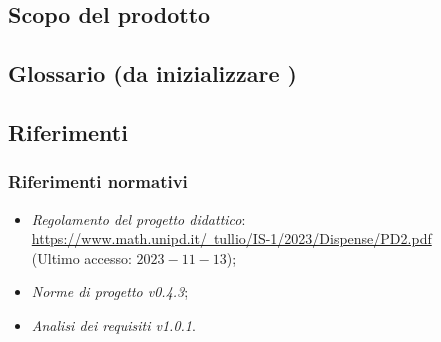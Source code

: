 \documentclass[10pt, a4paper]{article}
\begin{document}
\subsection{Scopo del prodotto}

\subsection{Glossario (da inizializzare )}

\subsection{Riferimenti}

\subsubsection{Riferimenti normativi} 
\begin{itemize}
\item \textit{Regolamento del progetto didattico}: \\
\href{https://www.math.unipd.it/~tullio/IS-1/2023/Dispense/PD2.pdf}{https://www.math.unipd.it/~tullio/IS-1/2023/Dispense/PD2.pdf}\\
(Ultimo accesso: $2023-11-13$);
\item \textit{Norme di progetto v0.4.3};
\item \textit{Analisi dei requisiti v1.0.1}.
\end{itemize}

\end{document}
